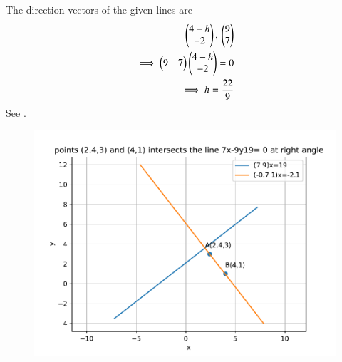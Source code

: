 The direction vectors of the given lines are 
\begin{align}
\begin{pmatrix}4-h\\ -2\end{pmatrix}
,\,
\begin{pmatrix}9\\ 7\end{pmatrix}
\\
\implies 
\begin{pmatrix}9& 7\end{pmatrix}\begin{pmatrix}4-h\\ -2\end{pmatrix}=0\\
\implies h=\frac{22}{9}
\end{align}
See  
		.
\begin{figure}[h]
\centering
\includegraphics[width=\columnwidth]{chapters/11/10/3/10/figs/fig.pdf}
\caption{}
		\label{fig:chapters/11/10/3/10/Figure}
\end{figure}
